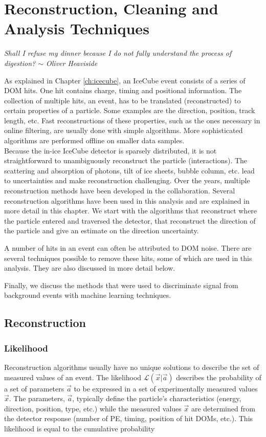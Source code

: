 \chapter{Reconstruction, Cleaning and Analysis Techniques}
\label{ch:reconstruction}
\begin{flushright}
\textit{Shall I refuse my dinner because I do not fully understand the process of digestion? $\sim$ Oliver Heaviside}
\end{flushright}
As explained in Chapter \ref{ch:icecube}, an IceCube event consists of a series of DOM hits. One hit contains charge, timing and positional information. The collection of multiple hits, an event, has to be translated (reconstructed) to certain properties of a particle. Some examples are the direction, position, track length, etc. Fast reconstructions of these properties, such as the ones necessary in online filtering, are usually done with simple algorithms. More sophisticated algorithms are performed offline on smaller data samples.\\

\noindent Because the in-ice IceCube detector is sparsely distributed, it is not straightforward to unambiguously reconstruct the particle (interactions). The scattering and absorption of photons, tilt of ice sheets, bubble column, etc. lead to uncertainties and make reconstruction challenging. Over the years, multiple reconstruction methods have been developed in the collaboration. Several reconstruction algorithms have been used in this analysis and are explained in more detail in this chapter. We start with the algorithms that reconstruct where the particle entered and traversed the detector, that reconstruct the direction of the particle and give an estimate on the direction uncertainty.

A number of hits in an event can often be attributed to DOM noise. There are several techniques possible to remove these hits, some of which are used in this analysis. They are also discussed in more detail below.

Finally, we discuss the methods that were used to discriminate signal from background events with machine learning techniques.

\section{Reconstruction}

\subsection{Likelihood}
Reconstruction algorithms usually have no unique solutions to describe the set of measured values of an event. The likelihood $\mathcal{L}(\vec{x} |\vec{a})$ describes the probability of a set of parameters ${\vec{a}}$ to be expressed in a set of experimentally measured values ${\vec{x}}$. The parameters, ${\vec{a}}$, typically define the particle's characteristics (energy, direction, position, type, etc.) while the measured values ${\vec{x}}$ are determined from the detector response (number of PE, timing, position of hit DOMs, etc.). This likelihood is equal to the cumulative probability


